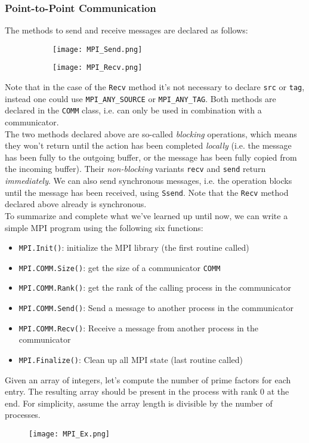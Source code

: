 \documentclass[main]{subfiles}
\begin{document}
\subsubsection{Point-to-Point Communication}
The methods to send and receive messages are declared as follows:
\begin{figure}[H]
    \centering
    \begin{subfigure}{.5\textwidth}
        \centering
        \texttt{[image: MPI\_Send.png]}
    \end{subfigure}%
    \begin{subfigure}{.5\textwidth}
        \centering
        \texttt{[image: MPI\_Recv.png]}
    \end{subfigure}
\end{figure}
Note that in the case of the \texttt{Recv} method it's not necessary to declare \texttt{src} or \texttt{tag}, instead one could use \texttt{MPI\_ANY\_SOURCE} or \texttt{MPI\_ANY\_TAG}. Both methods are declared in the \texttt{COMM} class, i.e. can only be used in combination with a communicator.\\[3mm]
The two methods declared above are so-called \textit{blocking} operations, which means they won't return until the action has been completed \textit{locally} (i.e. the message has been fully to the outgoing buffer, or the message has been fully copied from the incoming buffer). Their \textit{non-blocking} variants \texttt{recv} and \texttt{send} return \textit{immediately}. We can also send synchronous messages, i.e. the operation blocks until the message has been received, using \texttt{Ssend}. Note that the \texttt{Recv} method declared above already is synchronous.\\[3mm]
To summarize and complete what we've learned up until now, we can write a simple MPI program using the following six functions:
\begin{itemize}
    \item \texttt{MPI.Init()}: initialize the MPI library (the first routine called)
    \item \texttt{MPI.COMM.Size()}: get the size of a communicator \texttt{COMM}
    \item \texttt{MPI.COMM.Rank()}: get the rank of the calling process in the communicator
    \item \texttt{MPI.COMM.Send()}: Send a message to another process in the communicator
    \item \texttt{MPI.COMM.Recv()}: Receive a message from another process in the communicator
    \item \texttt{MPI.Finalize()}: Clean up all MPI state (last routine called)
\end{itemize}
\begin{example}
    Given an array of integers, let's compute the number of prime factors for each entry. The resulting array should be present in the process with rank 0 at the end. For simplicity, assume the array length is divisible by the number of processes.
    \begin{figure}[H]
        \centering
        \texttt{[image: MPI\_Ex.png]}
    \end{figure}
\end{example}
\end{document}
